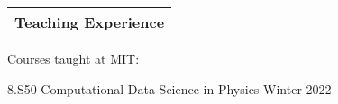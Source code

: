 \documentclass[letterpaper,11pt]{article}
\newenvironment{packed_itemize}{
\begin{itemize}[label=\raisebox{0.25ex}{\tiny$\bullet$}]
  \setlength{\itemsep}{3.9pt}
  \setlength{\parskip}{0pt}
  \setlength{\parsep}{0pt}}{\end{itemize}
}
\begin{document}
%
%
%



\noindent
\begin{tabular*}{\textwidth}{l@{\extracolsep{\fill}}}
\large {\sc \Large{Teaching Experience}}\\
\hline
\end{tabular*}\vspace{3.5mm}

\noindent
Courses taught at MIT:
\begin{packed_itemize}
  \item 8.S50 Computational Data Science in Physics \hfill Winter 2022
\end{packed_itemize}
\end{document}
